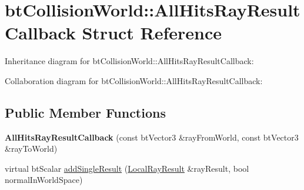 \hypertarget{structbt_collision_world_1_1_all_hits_ray_result_callback}{\section{bt\+Collision\+World\+:\+:All\+Hits\+Ray\+Result\+Callback Struct Reference}
\label{structbt_collision_world_1_1_all_hits_ray_result_callback}
}


Inheritance diagram for bt\+Collision\+World\+:\+:All\+Hits\+Ray\+Result\+Callback\+:


Collaboration diagram for bt\+Collision\+World\+:\+:All\+Hits\+Ray\+Result\+Callback\+:
\subsection*{Public Member Functions}
\begin{DoxyCompactItemize}
\item 
\hypertarget{structbt_collision_world_1_1_all_hits_ray_result_callback_a156b1c9d98439529dea5781f38444c1d}{{\bfseries All\+Hits\+Ray\+Result\+Callback} (const bt\+Vector3 \&ray\+From\+World, const bt\+Vector3 \&ray\+To\+World)}\label{structbt_collision_world_1_1_all_hits_ray_result_callback_a156b1c9d98439529dea5781f38444c1d}

\item 
virtual bt\+Scalar \hyperlink{structbt_collision_world_1_1_all_hits_ray_result_callback_a351da818747c246011624b9cb613c29b}{add\+Single\+Result} (\hyperlink{structbt_collision_world_1_1_local_ray_result}{Local\+Ray\+Result} \&ray\+Result, bool normal\+In\+World\+Space)
\end{DoxyCompactItemize}
